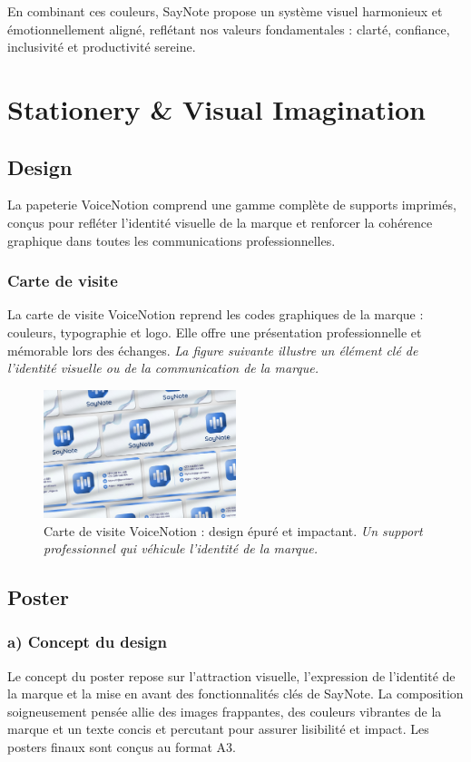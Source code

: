 En combinant ces couleurs, SayNote propose un système visuel harmonieux et émotionnellement aligné, reflétant nos valeurs fondamentales : clarté, confiance, inclusivité et productivité sereine.

\section{Stationery \& Visual Imagination}
\subsection{Design}
La papeterie VoiceNotion comprend une gamme complète de supports imprimés, conçus pour refléter l'identité visuelle de la marque et renforcer la cohérence graphique dans toutes les communications professionnelles.

\subsubsection*{Carte de visite}
La carte de visite VoiceNotion reprend les codes graphiques de la marque : couleurs, typographie et logo. Elle offre une présentation professionnelle et mémorable lors des échanges.
\noindent
\textit{La figure suivante illustre un élément clé de l'identité visuelle ou de la communication de la marque.}
\begin{figure}[H]
    \centering
    \includegraphics[width=0.5\textwidth]{docs/visual-indentity/pictures/card.jpg}
    \caption{Carte de visite VoiceNotion : design épuré et impactant. \newline\textit{Un support professionnel qui véhicule l'identité de la marque.}}
\end{figure}

\subsection{Poster}
\subsubsection*{a) Concept du design}
Le concept du poster repose sur l'attraction visuelle, l'expression de l'identité de la marque et la mise en avant des fonctionnalités clés de SayNote. La composition soigneusement pensée allie des images frappantes, des couleurs vibrantes de la marque et un texte concis et percutant pour assurer lisibilité et impact. Les posters finaux sont conçus au format A3.

